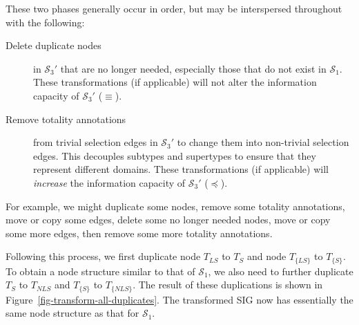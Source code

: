 \documentclass{sig-alternate-05-2015}
\newcommand{\LS}{\ensuremath{\mathit{LS}}}
\newcommand{\NLS}{\ensuremath{\mathit{NLS}}}
\newcommand{\T}[1]{\ensuremath{T_{#1}}}
\newcommand{\TT}[1]{\ensuremath{T_{\{#1\}}}}
\newcommand{\SC}[1]{\ensuremath{\mathcal{S}_{#1}}}
\begin{document}
These two phases generally occur in order, but may be interspersed throughout with the following:
\begin{description}

    \item[Delete duplicate nodes] in \(\SC{3}'\) that are no longer needed, especially those that do not exist in \(\SC{1}\). These transformations (if applicable) will not alter the information capacity of \(\SC{3}'\) (\(\equiv\)).
    
    \item[Remove totality annotations] from trivial selection edges in \(\SC{3}'\) to change them into non-trivial selection edges. This decouples subtypes and supertypes to ensure that they represent different domains. These transformations (if applicable) will \emph{increase} the information capacity of \(\SC{3}'\) (\(\preceq\)).
    
\end{description}
For example, we might duplicate some nodes, remove some totality annotations, move or copy some edges, delete some no longer needed nodes, move or copy some more edges, then remove some more totality annotations.

Following this process, we first duplicate node \(\T{\LS}\) to \(\T{S}\) and node \(\TT{\LS}\) to \(\TT{S}\). To obtain a node structure similar to that of \(\SC{1}\), we also need to further duplicate \(\T{S}\) to \(\T{\NLS}\) and \(\TT{S}\) to \(\TT{\NLS}\). The result of these duplications is shown in Figure~\ref{fig-transform-all-duplicates}. The transformed SIG now has essentially the same node structure as that for \(\SC{1}\).

\end{document}
